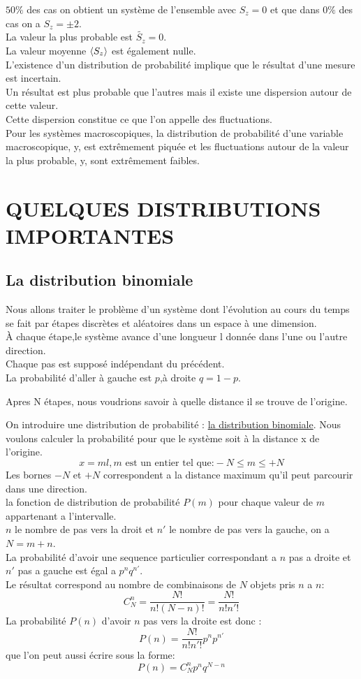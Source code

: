 \documentclass[12pt,oneside]{book}
\begin{document}
$50\%$ des cas on obtient un système de l'ensemble avec $S_z = 0$ et que dans $0\%$ des cas on a $S_z = \pm 2$.\\
La valeur la plus probable est $\tilde{S_z} = 0$.\\
La valeur moyenne $\langle S_z \rangle$ est également nulle.\\
L'existence d'un distribution de probabilité implique que le résultat d'une mesure est incertain.\\
Un résultat est plus probable que l'autres mais il existe une dispersion autour de cette valeur.\\
Cette dispersion constitue ce que l'on appelle des fluctuations.\\

Pour les systèmes macroscopiques, la distribution de probabilité d'une variable macroscopique, y, est extrêmement piquée et les fluctuations autour de la valeur la plus probable, y, sont extrêmement faibles.
\section{QUELQUES DISTRIBUTIONS IMPORTANTES}
\subsection{La distribution binomiale}
Nous allons traiter le problème d'un système dont l'évolution au cours du temps se fait par étapes discrètes et aléatoires dans un espace à une dimension.\\
À chaque étape,le système avance d'une longueur l donnée dans l'une ou l'autre direction.\\
Chaque pas est supposé indépendant du précédent.\\
La probabilité d'aller à gauche est $p$,à droite $q = 1-p$.\\
\begin{center}
	Apres N étapes, nous voudrions savoir à quelle distance il se trouve de l'origine.
\end{center}
On  introduire une distribution de probabilité : \underline{la distribution binomiale}.
Nous voulons calculer la probabilité pour que le système soit à la distance x de l'origine.
\[x =ml , m \text{ est un entier tel que:} -N\leq m \leq +N\]
Les bornes $-N$ et $+N$ correspondent a la distance maximum qu'il peut parcourir dans une direction.\\
la fonction de distribution de probabilité $P(m)$ pour chaque valeur de $m$ appartenant a l'intervalle.\\
$n$ le nombre de pas vers la droit et $n'$ le nombre de pas vers la gauche, on a $N = m + n$.\\
La probabilité d'avoir une sequence particulier correspondant a $n$ pas a droite et $n'$ pas a gauche est égal a $p^nq^{n'}$.\\
Le résultat correspond au nombre de combinaisons de $N$ objets pris $n$ a $n$:
\[ C^n_N=\frac{N!}{n!(N-n)!}=\frac{N!}{n!n'!} \]
La probabilité $P(n)$ d'avoir $n$ pas vers la droite est donc :
\[P(n) = \frac{N!}{n!n'!}p^np^{n'}\]
que l'on peut aussi écrire sous la forme:
\[P(n) = C^n_Np^nq^{N-n}\]
\end{document}
